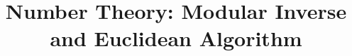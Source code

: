 \documentclass[a4paper,12pt]{article}
\begin{document}

\title{Number Theory: Modular Inverse and Euclidean Algorithm}
\newcommand\event{S.3,4 Elite Mathematics Training}
\newcommand\learningobjective{
\item Learn modular inverse and its usage
\item Review Euclidean Algorithm and learn the extension
}

\myfrontpage






\begin{question}[]{3}
    
    
    
    
    
    
    
\end{question}
\end{document}
